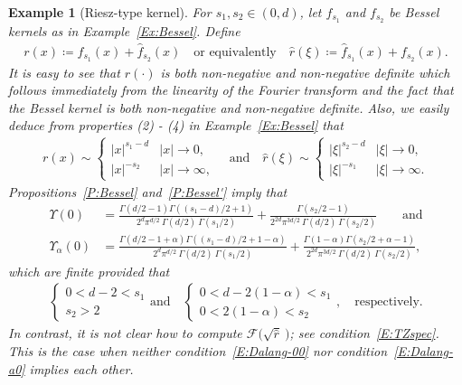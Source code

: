 \documentclass[sn-mathphys]{sn-jnl}%
\numberwithin{equation}{section}
\theoremstyle{thmstyleone}%
\theoremstyle{thmstyletwo}%
\newtheorem{example}{Example}[section]%
\theoremstyle{thmstylethree}%
\begin{document}
\begin{example}[Riesz-type kernel]\label{Ex:Riesz-T}
  For $s_1, s_2\in (0,d)$, let $f_{s_1}$ and $f_{s_2}$ be Bessel kernels as in
  Example~\ref{Ex:Bessel}. Define
  \begin{align*}
    r(x)\coloneqq f_{s_1}(x) + \widehat{f}_{s_2}(x) \quad \text{or equivalently} \quad
    \widehat{r}(\xi)\coloneqq \widehat{f}_{s_1}(x) + f_{s_2}(x).
  \end{align*}
  It is easy to see that $r(\cdot)$ is both non-negative and non-negative definite which follows
  immediately from the linearity of the Fourier transform and the fact that the Bessel kernel is
  both non-negative and non-negative definite. Also, we easily deduce from properties (2) - (4) in
  Example~\ref{Ex:Bessel} that
  \begin{align*}
    r(x) \sim
    \begin{cases}
      \lvert x \rvert^{s_1-d} & \lvert x \rvert \to 0, \\
      \lvert x \rvert^{-s_2}  & \lvert x \rvert \to \infty,
    \end{cases}
    \quad \text{and} \quad
    \widehat{r}(\xi) \sim
    \begin{cases}
      \lvert\xi\rvert^{s_2 - d} & \lvert\xi\rvert \to 0, \\
      \lvert\xi\rvert^{-s_1}    & \lvert\xi\rvert \to \infty.
    \end{cases}
  \end{align*}
  Propositions~\ref{P:Bessel} and~\ref{P:Bessel'} imply that
  \begin{align}\label{E:RieszType-0}
    \Upsilon(0) & =
    \frac{\Gamma\left(d/2 -1\right) \Gamma\left((s_1 - d)/2 + 1\right)}{2^d \pi^{d/2} \: \Gamma(d/2)\:\Gamma\left(s_1/2\right)}
    + \frac{\Gamma\left(s_2/2 - 1\right)}{2^{2d} \pi^{3d/2} \: \Gamma(d/2) \: \Gamma\left(s_2/2\right)} \qquad \text{and} \\
    \Upsilon_{\alpha}(0) & =
    \frac{\Gamma\left(d/2 -1 + \alpha\right) \Gamma\left((s_1 - d)/2 + 1 - \alpha\right)}{2^d \pi^{d/2} \: \Gamma(d/2)\:\Gamma\left(s_1/2\right)}
    + \frac{\Gamma\left(1 - \alpha\right) \Gamma\left( s_2/2 + \alpha - 1\right)}{2^{2d} \pi^{3d/2} \: \Gamma(d/2) \: \Gamma\left(s_2/2\right)},
    \label{E:RieszType}
  \end{align}
  which are finite provided that
	\begin{align}\label{E:RieszTypeCond}
    \begin{cases}
      0 < d - 2 < s_1 \\
      s_2 > 2
    \end{cases}
    \text{and} \quad
    \begin{cases}
      0 < d - 2(1-\alpha) < s_1 \\
      0 < 2(1-\alpha) < s_2
    \end{cases},
    \quad \text{respectively.}
	\end{align}
  In contrast, it is not clear how to compute $\mathcal{F}\big(\sqrt{\widehat{r}}\:\big)$; see
  condition~\eqref{E:TZspec}. This is the case when neither condition~\eqref{E:Dalang-00} nor
  condition~\eqref{E:Dalang-a0} implies each other.
\end{example}
\end{document}
